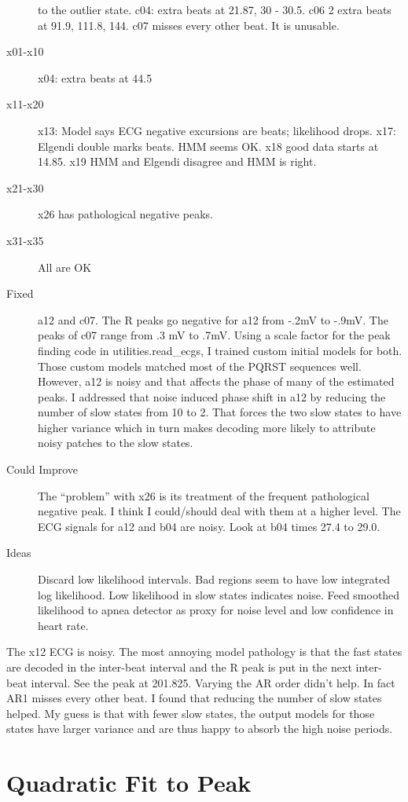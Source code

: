 \documentclass[12pt]{article}
\begin{document}
\begin{description}
  to the outlier state.  c04: extra beats at 21.87, 30 - 30.5.  c06 2
  extra beats at 91.9, 111.8, 144.  c07 misses every other beat.  It
  is unusable.
\item[x01-x10] x04: extra beats at 44.5
\item[x11-x20] x13: Model says ECG negative excursions are beats;
  likelihood drops.  x17: Elgendi double marks beats.  HMM seems OK.  x18
  good data starts at 14.85.  x19 HMM and Elgendi disagree and HMM is
  right.
\item[x21-x30] x26 has pathological negative peaks.
\item[x31-x35] All are OK
\item[Fixed] a12 and c07.  The R peaks go negative for a12 from -.2mV
  to -.9mV.  The peaks of c07 range from .3 mV to .7mV.  Using a scale
  factor for the peak finding code in utilities.read\_ecgs, I trained
  custom initial models for both.  Those custom models matched most of
  the PQRST sequences well.  However, a12 is noisy and that affects
  the phase of many of the estimated peaks.  I addressed that noise
  induced phase shift in a12 by reducing the number of slow states
  from 10 to 2.  That forces the two slow states to have higher
  variance which in turn makes decoding more likely to attribute noisy
  patches to the slow states.
\item[Could Improve] The ``problem'' with x26 is its treatment of the
  frequent pathological negative peak.  I think I could/should deal
  with them at a higher level.  The ECG signals for a12 and b04 are
  noisy.  Look at b04 times 27.4 to 29.0.
\item[Ideas] Discard low likelihood intervals.  Bad regions seem to have low
integrated log likelihood.  Low likelihood in slow states indicates
noise.  Feed smoothed likelihood to apnea detector as proxy for noise
level and low confidence in heart rate.
\end{description}

The x12 ECG is noisy.  The most annoying model pathology is that the
fast states are decoded in the inter-beat interval and the R peak is
put in the next inter-beat interval.  See the peak at 201.825.
Varying the AR order didn't help.  In fact AR1 misses every other
beat.  I found that reducing the number of slow states helped.  My
guess is that with fewer slow states, the output models for those
states have larger variance and are thus happy to absorb the high
noise periods.

\section{Quadratic Fit to Peak}
\label{sec:quadratic}
\end{document}
